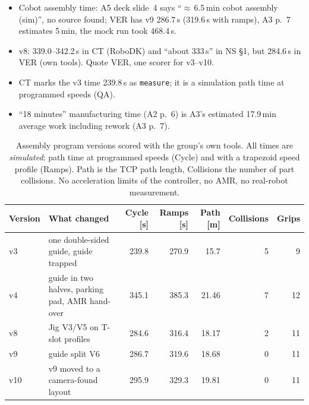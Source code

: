 {\begin{itemize}
    \item Cobot assembly time: A5 deck slide~4 says ``\(\approx\)\,6.5\,min cobot assembly (sim)'', no source found; VER has v9 286.7\,s (319.6\,s with ramps), A3 p.~7 estimates 5\,min, the mock run took 468.4\,s.
    \item v8: 339.0--342.2\,s in CT (RoboDK) and ``about 333\,s'' in NS \S1, but 284.6\,s in VER (own tools). Quote VER, one scorer for v3--v10.
    \item CT marks the v3 time 239.8\,s as \texttt{measure}; it is a simulation path time at programmed speeds (QA).
    \item ``18 minutes'' manufacturing time (A2 p.~6) is A3's estimated 17.9\,min average work including rework (A3 p.~7).
\end{itemize}}

\begin{table}[H]
    \centering
    \caption{Assembly program versions scored with the group's own tools. All times are
    \emph{simulated}: path time at programmed speeds (Cycle) and with a trapezoid speed profile (Ramps).
    Path is the TCP path length, Collisions the number of part collisions. No acceleration limits of the controller, no AMR, no real-robot measurement.}
    \label{tab:versions}
    \small
    \begin{tabular}{l p{44mm} r r r r r}
        \hline
        Version & What changed & Cycle [s] & Ramps [s] & Path [m] & Collisions & Grips \\
        \hline
        v3  & one double-sided guide, guide trapped & 239.8 & 270.9 & 15.7 & 5 & 9 \\
        v4  & guide in two halves, parking pad, AMR hand-over & 345.1 & 385.3 & 21.46 & 7 & 12 \\
        v8  & Jig V3/V5 on T-slot profiles & 284.6 & 316.4 & 18.17 & 2 & 11 \\
        v9  & guide split V6 & 286.7 & 319.6 & 18.68 & 0 & 11 \\
        v10 & v9 moved to a camera-found layout & 295.9 & 329.3 & 19.81 & 0 & 11 \\
        \hline
    \end{tabular}
\end{table}

